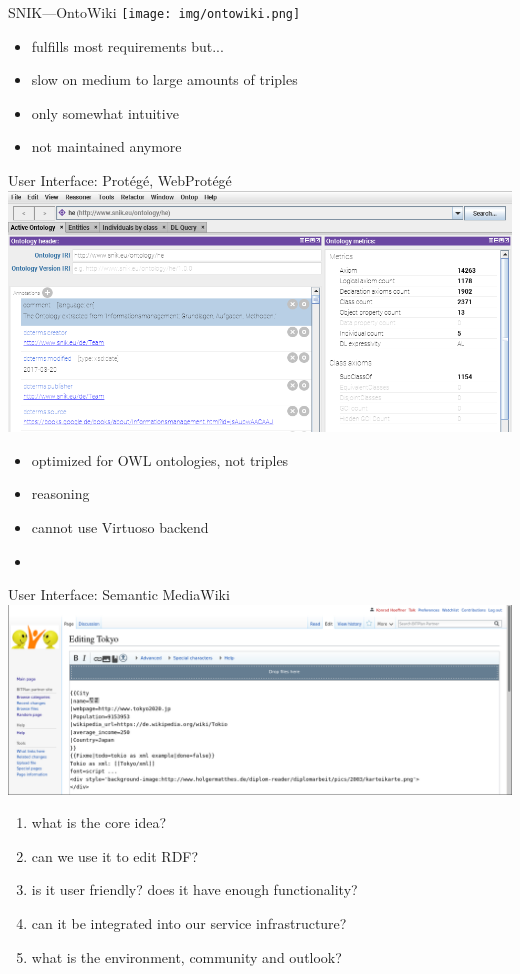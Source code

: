 \documentclass[aspectratio=1610]{beamer}
\begin{document}
\begin{frame}{SNIK---OntoWiki}
\centering
\texttt{[image: img/ontowiki.png]}
\begin{itemize}
\item fulfills most requirements but...
\item slow on medium to large amounts of triples
\item only somewhat intuitive
\item not maintained anymore
\end{itemize}
\end{frame}

\begin{frame}{User Interface: Prot\'eg\'e, WebProt\'eg\'e}
\centering
\includegraphics[width=0.6\paperwidth]{img/protege.png}
\begin{itemize}
\item optimized for OWL ontologies, not triples
\item reasoning
\item cannot use Virtuoso backend
\item 
\end{itemize}
\end{frame}

\begin{frame}{User Interface: Semantic MediaWiki}
\centering
\includegraphics[width=0.6\paperwidth]{img/smw-tokyo.png}
\begin{enumerate}
\item what is the core idea?
\item can we use it to edit RDF?
\item is it user friendly? does it have enough functionality?
\item can it be integrated into our service infrastructure?
\item what is the environment, community and outlook?
\end{enumerate}
\end{frame}
\end{document}
